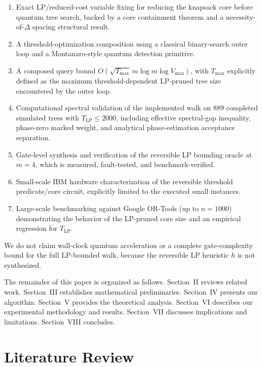\documentclass[conference]{IEEEtran}
\begin{document}
\begin{enumerate}
    \item Exact LP/reduced-cost variable fixing for reducing the knapsack core before quantum tree search, backed by a core containment theorem and a necessity-of-$\Delta$ spacing structural result.
    \item A threshold-optimization composition using a classical binary-search outer loop and a Montanaro-style quantum detection primitive.
    \item A composed query bound $O\!\left(\sqrt{T_{\max}}\,m\log m\log V_{\max}\right)$, with $T_{\max}$ explicitly defined as the maximum threshold-dependent LP-pruned tree size encountered by the outer loop.
    \item Computational spectral validation of the implemented walk on 889 completed simulated trees with $T_{\text{LP}} \le 2000$, including effective spectral-gap inequality, phase-zero marked weight, and analytical phase-estimation acceptance separation.
    \item Gate-level synthesis and verification of the reversible LP bounding oracle at $m=4$, which is measured, fault-tested, and benchmark-verified.
    \item Small-scale IBM hardware characterization of the reversible threshold predicate/core circuit, explicitly limited to the executed small instances.
    \item Large-scale benchmarking against Google OR-Tools (up to $n=1000$) demonstrating the behavior of the LP-pruned core size and an empirical regression for $T_{\text{LP}}$.
\end{enumerate}

We do not claim wall-clock quantum acceleration or a complete gate-complexity bound for the full LP-bounded walk, because the reversible LP heuristic $h$ is not synthesized.

The remainder of this paper is organized as follows. Section~II reviews related work. Section~III establishes mathematical preliminaries. Section~IV presents our algorithm. Section~V provides the theoretical analysis. Section~VI describes our experimental methodology and results. Section~VII discusses implications and limitations. Section~VIII concludes.

\section{Literature Review}
\end{document}
